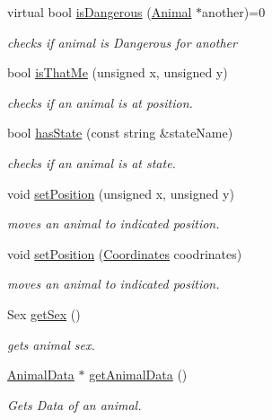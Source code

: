 \begin{DoxyCompactItemize}
virtual bool \hyperlink{class_animal_a8d6a4aef56a2df828c8b286d993c3037}{is\+Dangerous} (\hyperlink{class_animal}{Animal} $\ast$another)=0
\begin{DoxyCompactList}\small\item\em checks if animal is Dangerous for another \end{DoxyCompactList}\item 
bool \hyperlink{class_animal_aae84f5e4412829e71f73c262600be323}{is\+That\+Me} (unsigned x, unsigned y)
\begin{DoxyCompactList}\small\item\em checks if an animal is at position. \end{DoxyCompactList}\item 
bool \hyperlink{class_animal_ad15c619e0b16bd89d8d38360f983955a}{has\+State} (const string \&state\+Name)
\begin{DoxyCompactList}\small\item\em checks if an animal is at state. \end{DoxyCompactList}\item 
void \hyperlink{class_animal_a5694a379251e01647fc8b3a8dd9bb21b}{set\+Position} (unsigned x, unsigned y)
\begin{DoxyCompactList}\small\item\em moves an animal to indicated position. \end{DoxyCompactList}\item 
void \hyperlink{class_animal_ad995dd1464ec7d41ff3ac8244aa8085a}{set\+Position} (\hyperlink{struct_coordinates}{Coordinates} coodrinates)
\begin{DoxyCompactList}\small\item\em moves an animal to indicated position. \end{DoxyCompactList}\item 
Sex \hyperlink{class_animal_a6d282165027bf10170923c6c87b01f01}{get\+Sex} ()
\begin{DoxyCompactList}\small\item\em gets animal sex. \end{DoxyCompactList}\item 
\hyperlink{class_animal_data}{Animal\+Data} $\ast$ \hyperlink{class_animal_a0fb94a1af4632400b4fe8712a343dfc4}{get\+Animal\+Data} ()
\begin{DoxyCompactList}\small\item\em Gets Data of an animal. \end{DoxyCompactList}\item 

\end{DoxyCompactItemize}

